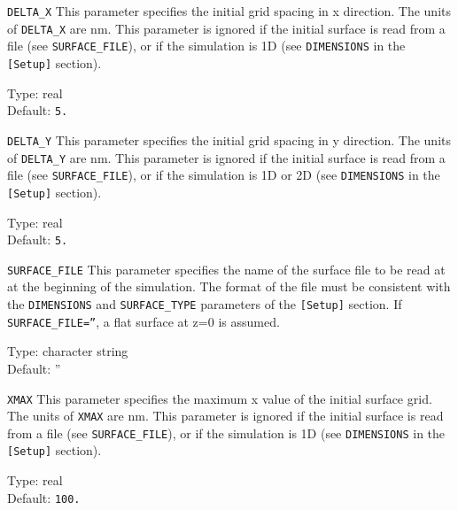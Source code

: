 \begin{keydescription}{\texttt{DELTA\_X}}
This parameter specifies the initial grid spacing in x direction. The units of
\texttt{DELTA\_X} are nm. This parameter is ignored if the initial surface
is read from a file (see \texttt{SURFACE\_FILE}), or if the simulation is 1D
(see \texttt{DIMENSIONS} in the \texttt{[Setup]} section).
\begin{keytab}
   Type:    \> real \\
   Default: \> \texttt{5.}
\end{keytab}
\end{keydescription}

\begin{keydescription}{\texttt{DELTA\_Y}}
This parameter specifies the initial grid spacing in y direction. The units of
\texttt{DELTA\_Y} are nm. This parameter is ignored if the initial surface
is read from a file (see \texttt{SURFACE\_FILE}), or if the simulation is 1D or
2D (see \texttt{DIMENSIONS} in the \texttt{[Setup]} section).
\begin{keytab}
   Type:    \> real \\
   Default: \> \texttt{5.}
\end{keytab}
\end{keydescription}

\begin{keydescription}{\texttt{SURFACE\_FILE}}
This parameter specifies the name of the surface file to be read at at the
beginning of the simulation. The format of the file must be consistent with the
\texttt{DIMENSIONS} and \texttt{SURFACE\_TYPE} parameters of the
\texttt{[Setup]} section. If \texttt{SURFACE\_FILE=''}, a flat surface at
z=0 is assumed.
\begin{keytab}
   Type:    \> character string \\
   Default: \> ''
\end{keytab}
\end{keydescription}

\begin{keydescription}{\texttt{XMAX}}
This parameter specifies the maximum x value of the initial surface grid. The
units of \texttt{XMAX} are nm. This parameter is ignored if the initial surface
is read from a file (see \texttt{SURFACE\_FILE}), or if the simulation is 1D
(see \texttt{DIMENSIONS} in the \texttt{[Setup]} section).
\begin{keytab}
   Type:    \> real \\
   Default: \> \texttt{100.}
\end{keytab}
\end{keydescription}

